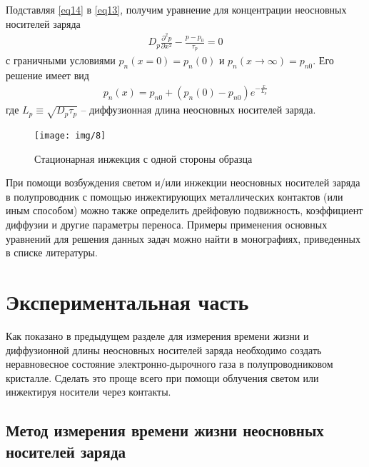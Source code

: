 Подставляя \eqref{eq14} в \eqref{eq13}, получим уравнение для концентрации
неосновных носителей заряда
\begin{gather}
	\label{eq15}
	D_{p} \frac{\partial^{2} p}{\partial x^{2}}-\frac{p-p_{0}}{\tau_{p}}=0
\end{gather}
с граничными условиями $p_{n}(x=0)=p_{n}(0)$ и $p_{n}(x \rightarrow \infty)=p_{n 0}$. Его решение имеет вид
\begin{gather}
	\label{eq16}
	p_{n}(x)=p_{n 0}+\left(p_{n}(0)-p_{n 0}\right) e^{-\frac{x}{L_{p}}}
\end{gather}
где $L_{p} \equiv \sqrt{D_{p} \tau_{p}}$ -- диффузионная длина неосновных носителей заряда.

\begin{figure}[H]
	\centering
	\texttt{[image: img/8]}
	\caption{Стационарная инжекция с одной стороны образца}
	\label{fig:figure7}
\end{figure}

При помощи возбуждения светом и/или инжекции неосновных носителей заряда в полупроводник с помощью инжектирующих металлических контактов (или иным способом) можно также определить дрейфовую подвижность, коэффициент диффузии и другие параметры переноса. Примеры применения основных уравнений для решения данных задач можно найти в монографиях, приведенных в списке литературы.


\section{Экспериментальная часть}
Как показано в предыдущем разделе для измерения времени жизни и диффузионной длины неосновных носителей заряда необходимо создать неравновесное состояние электронно-дырочного газа в полупроводниковом кристалле. Сделать это проще всего при помощи облучения светом или инжектируя носители через контакты.

\subsection{Метод измерения времени жизни неосновных носителей заряда}

